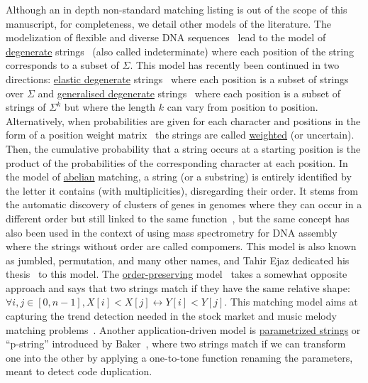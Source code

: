 Although an in depth non-standard matching listing is out of the scope of this manuscript, for completeness, we detail other models of the literature.
The modelization of flexible and diverse DNA sequences~\cite{comm1970iupac} lead to the model of \underline{degenerate} strings~\cite{abrahamson1987generalized} (also called indeterminate) where each position of the string corresponds to a subset of $\Sigma$.
This model has recently been continued in two directions: \underline{elastic degenerate} strings~\cite{iliopoulos2021efficient} where each position is a subset of strings over $\Sigma$ and \underline{generalised degenerate} strings~\cite{alzamel_et_al:LIPIcs:2018:9323} where each position is a subset of strings of $\Sigma^k$ but where the length $k$ can vary from position to position.
Alternatively, when probabilities are given for each character and positions in the form of a position weight matrix~\cite{thompson1994clustal} the strings are called \underline{weighted} (or uncertain). Then, the cumulative probability that a string occurs at a starting position is the product of the probabilities of the corresponding character at each position.
In the model of \underline{abelian} matching, a string (or a substring) is entirely identified by the letter it contains (with multiplicities), disregarding their order. It stems from the automatic discovery of clusters of genes in genomes where they can occur in a different order but still linked to the same function~\cite{eres2004permutation}, but the same concept has also been used in the context  of using mass spectrometry for DNA assembly~\cite{bocker2003sequencing} where the strings without order are called compomers. This model is also known as jumbled, permutation, and many other names, and Tahir Ejaz dedicated his thesis~\cite{ejaz2010abelian} to this model.
The \underline{order-preserving} model~\cite{kim2014order,kubica2013linear} takes a somewhat opposite approach and says that two strings match if they have the same relative shape: $\forall i,j \in [0,n-1], X[i] < X[j] \leftrightarrow Y[i] < Y[j]$. This matching model aims at capturing the trend detection needed in the stock market and music melody matching problems~\cite{kim2014order}.
%
Another application-driven model is \underline{parametrized strings} or ``p-string'' introduced by Baker~\cite{baker1993theory}, where two strings match if we can transform one into the other by applying a one-to-tone function renaming the parameters, meant to detect code duplication.


